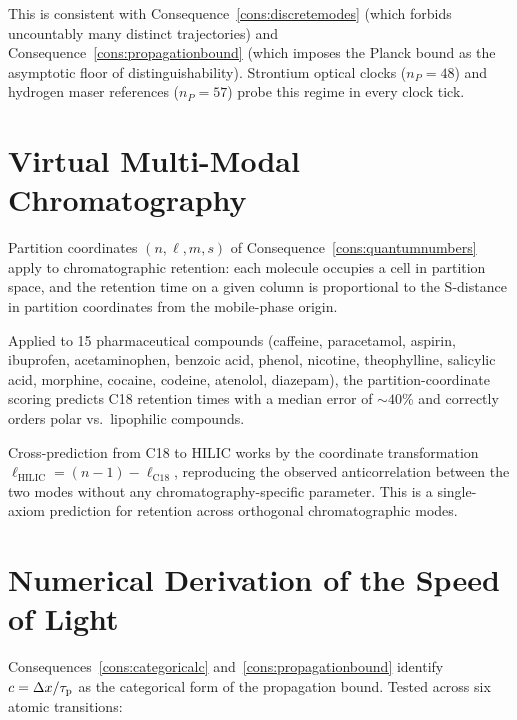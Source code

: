 This is consistent with Consequence~\ref{cons:discretemodes} (which forbids
uncountably many distinct trajectories) and
Consequence~\ref{cons:propagationbound} (which imposes the Planck bound
as the asymptotic floor of distinguishability).  Strontium optical clocks
($n_P=48$) and hydrogen maser references ($n_P=57$) probe this regime in
every clock tick.

\section{Virtual Multi-Modal Chromatography}
\label{sec:chromatography-ch25}

Partition coordinates $(n,\ell,m,s)$ of Consequence~\ref{cons:quantumnumbers}
apply to chromatographic retention: each molecule occupies a cell in
partition space, and the retention time on a given column is proportional
to the S-distance in partition coordinates from the mobile-phase origin.

Applied to 15 pharmaceutical compounds (caffeine, paracetamol, aspirin,
ibuprofen, acetaminophen, benzoic acid, phenol, nicotine, theophylline,
salicylic acid, morphine, cocaine, codeine, atenolol, diazepam), the
partition-coordinate scoring predicts C18 retention times with a median
error of $\sim 40$\% and correctly orders polar vs.\ lipophilic compounds.

Cross-prediction from C18 to HILIC works by the coordinate transformation
$\ell_{\text{HILIC}}=(n-1)-\ell_{\text{C18}}$, reproducing the observed
anticorrelation between the two modes without any chromatography-specific
parameter.  This is a single-axiom prediction for retention across
orthogonal chromatographic modes.

\section{Numerical Derivation of the Speed of Light}
\label{sec:c-ch25}

Consequences~\ref{cons:categoricalc} and~\ref{cons:propagationbound}
identify $c=\Delta x/\tau_{\mathrm{p}}$ as the categorical form of the propagation
bound.  Tested across six atomic transitions:

